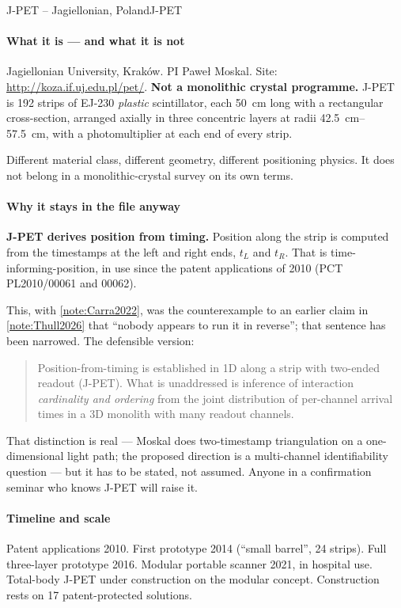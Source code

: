 \begin{programnote}{J-PET -- Jagiellonian, Poland}{J-PET}
 
\paragraph{What it is --- and what it is not}
Jagiellonian University, Kraków. PI Paweł Moskal. Site:
\url{http://koza.if.uj.edu.pl/pet/}. \textbf{Not a monolithic
crystal programme.} J-PET is 192 strips of EJ-230 \emph{plastic} scintillator,
each \qty{50}{\centi\metre} long with a 
rectangular cross-section, arranged axially in three concentric layers at radii
\qtyrange{42.5}{57.5}{\centi\metre}, with a photomultiplier at each end of every
strip.
 
Different material class, different geometry, different positioning physics. It
does not belong in a monolithic-crystal survey on its own terms.
 
\paragraph{Why it stays in the file anyway}
\textbf{J-PET derives position from timing.} Position along the strip is computed
from the timestamps at the left and right ends, $t_L$ and $t_R$. That is
time-informing-position, in use since the patent applications of 2010
(PCT PL2010/00061 and 00062).
 
This, with \ref{note:Carra2022}, was the counterexample to an earlier claim
in \ref{note:Thull2026} that ``nobody appears to run it in reverse''; that
sentence has been narrowed. The defensible version:
 
\begin{quote}
	Position-from-timing is established in 1D along a strip with two-ended
	readout (J-PET). What is unaddressed is inference of interaction
	\emph{cardinality and ordering} from the joint distribution of per-channel
	arrival times in a 3D monolith with many readout channels.
\end{quote}
 
That distinction is real --- Moskal does two-timestamp triangulation on a
one-dimensional light path; the proposed direction is a multi-channel
identifiability question --- but it has to be stated, not assumed. Anyone in a
confirmation seminar who knows J-PET will raise it.
 
\paragraph{Timeline and scale}
Patent applications 2010. First prototype 2014 (``small barrel'', 24 strips). Full three-layer
prototype 2016. Modular portable scanner 2021, in hospital use. Total-body J-PET
under construction on the modular concept. Construction rests on 17
patent-protected solutions.
 

\end{programnote}
